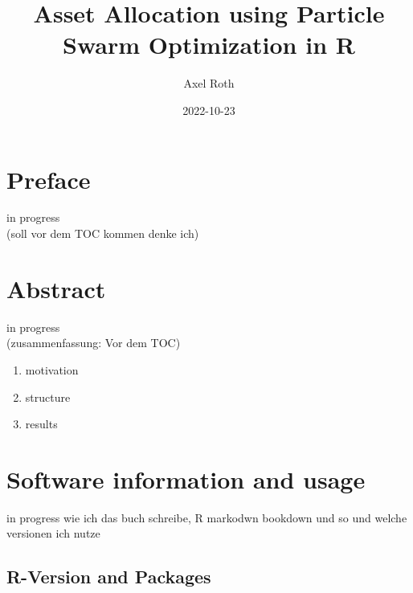 \documentclass[
  oneside]{book}
\title{Asset Allocation using Particle Swarm Optimization in R}
\author{Axel Roth}
\date{2022-10-23}
\begin{document}
\maketitle

{
\setcounter{tocdepth}{1}
\tableofcontents
}
\hypertarget{preface}{%
\chapter*{Preface}\label{preface}}

\renewcommand{\chaptermark}[1]{\markboth{\uppercase{#1}}{\uppercase{#1}}}

\textbar\textbar\textbar in progress\textbar\textbar\textbar{}\\
(soll vor dem TOC kommen denke ich)

\renewcommand{\chaptermark}[1]{\markboth{\uppercase{\thechapter. \ #1}}{}}

\hypertarget{abstract}{%
\chapter*{Abstract}\label{abstract}}

\textbar\textbar\textbar in progress\textbar\textbar\textbar{}\\
(zusammenfassung: Vor dem TOC)

\begin{enumerate}
\def\labelenumi{\arabic{enumi}.}
\item
  motivation
\item
  structure
\item
  results
\end{enumerate}

\hypertarget{software-information-and-usage}{%
\chapter{Software information and usage}\label{software-information-and-usage}}

\textbar\textbar\textbar in progress\textbar\textbar\textbar{}
wie ich das buch schreibe, R markodwn bookdown und so und welche versionen ich nutze

\hypertarget{r-version-and-packages}{%
\section{R-Version and Packages}\label{r-version-and-packages}}
\end{document}
